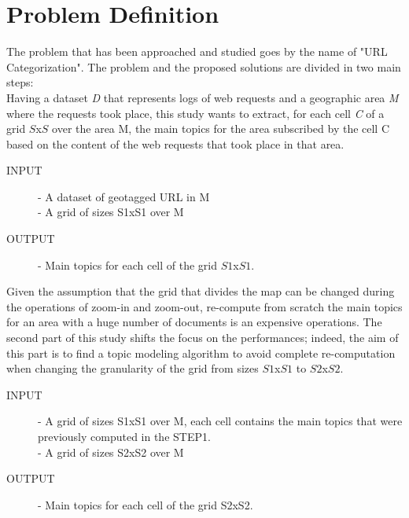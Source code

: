 \section{Problem Definition}

The problem that has been approached and studied goes by the name of "URL Categorization". The problem and the proposed solutions are divided in two main steps:\\
	
 Having a dataset {\textit D} that represents logs of web requests and a geographic area {\textit M} where the requests took place, this study wants to extract, for each cell {\textit C} of a grid $S$x$S$ over the area M, the main topics for the area subscribed by the cell C based on the content of the web requests that took place in that area.

	
	\begin{description}
    	\item [INPUT] - A dataset of geotagged URL in M\\ 
					  - A grid of sizes S1xS1 over M
		
		\item [OUTPUT] - Main topics for each cell of the grid $S1$x$S1$.\\
	\end{description}
		
 Given the assumption that the grid that divides the map can be changed during the operations of zoom-in and zoom-out, re-compute from scratch the main topics for an area with a huge number of documents is an expensive operations. The second part of this study shifts the focus on the performances; indeed, the aim of this part is to find a topic modeling algorithm to avoid complete re-computation when changing the granularity of the grid from sizes $S1$x$S1$ to $S2$x$S2$.\\
	
	\begin{description}
		\item [INPUT] - A grid of sizes S1xS1 over M, each cell contains the main topics that were previously computed in the STEP1.\\
					  - A grid of sizes S2xS2 over M

					  
		\item [OUTPUT] - Main topics for each cell of the grid S2xS2.\\
	\end{description}	

